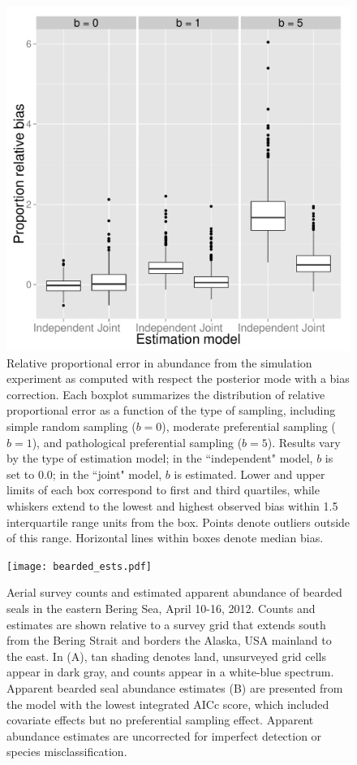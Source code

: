 \documentclass[times,mee,doublespace,]{besauth2}
\begin{document}
\begin{figure} %
\begin{center}
\includegraphics[width=170mm]{bias.pdf}
\caption{Relative proportional error in abundance from the simulation experiment as computed with respect the posterior mode with a bias correction. Each boxplot summarizes the distribution of relative proportional error as a function of the type of sampling, including simple random sampling ($b=0$), moderate preferential sampling ($b=1$), and pathological preferential sampling ($b=5$). Results vary by the type of estimation model; in the ``independent" model, $b$ is set to 0.0; in the ``joint" model, $b$ is estimated.  Lower and upper limits of each box correspond to first and third quartiles, while whiskers extend to the lowest and highest observed bias within 1.5 interquartile range units from the box.  Points denote outliers outside of this range.  Horizontal lines within boxes denote median bias.  }
\label{fig:sim_bias}
\end{center}
\end{figure}

\begin{figure} %
\begin{center}
\texttt{[image: bearded\_ests.pdf]}
\caption{Aerial survey counts and estimated apparent abundance of bearded seals in the eastern Bering Sea, April 10-16, 2012. Counts and estimates are shown relative to a survey grid that extends south from the Bering Strait and borders the Alaska, USA mainland to the east. In (A), tan shading denotes land, unsurveyed grid cells appear in dark gray, and counts appear in a white-blue spectrum.  Apparent bearded seal abundance estimates (B) are presented from the model with the lowest integrated AICc score, which included covariate effects but no preferential sampling effect.  Apparent abundance estimates are uncorrected for imperfect detection or species misclassification.}
\label{fig:bearded_ests}
\end{center}
\end{figure}
\end{document}
